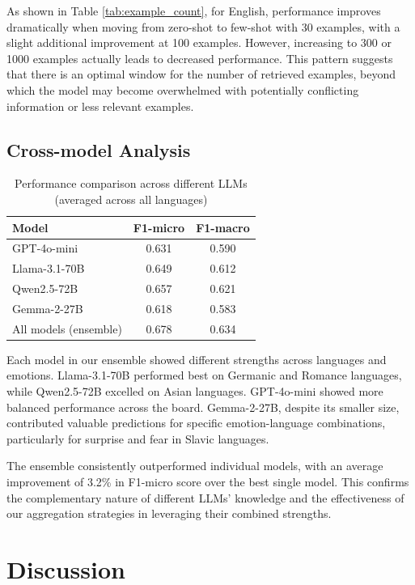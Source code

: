\documentclass[a4paper,12pt]{extarticle}
\begin{document}
As shown in Table \ref{tab:example_count}, for English, performance improves dramatically when moving from zero-shot to few-shot with 30 examples, with a slight additional improvement at 100 examples. However, increasing to 300 or 1000 examples actually leads to decreased performance. This pattern suggests that there is an optimal window for the number of retrieved examples, beyond which the model may become overwhelmed with potentially conflicting information or less relevant examples.

\subsection{Cross-model Analysis}

\begin{table}[h]
\centering
\begin{tabular}{lcc}
\toprule
\textbf{Model} & \textbf{F1-micro} & \textbf{F1-macro} \\
\midrule
GPT-4o-mini & 0.631 & 0.590 \\
Llama-3.1-70B & 0.649 & 0.612 \\
Qwen2.5-72B & 0.657 & 0.621 \\
Gemma-2-27B & 0.618 & 0.583 \\
All models (ensemble) & 0.678 & 0.634 \\
\bottomrule
\end{tabular}
\caption{Performance comparison across different LLMs (averaged across all languages)}
\label{tab:cross_model}
\end{table}

Each model in our ensemble showed different strengths across languages and emotions. Llama-3.1-70B performed best on Germanic and Romance languages, while Qwen2.5-72B excelled on Asian languages. GPT-4o-mini showed more balanced performance across the board. Gemma-2-27B, despite its smaller size, contributed valuable predictions for specific emotion-language combinations, particularly for surprise and fear in Slavic languages.

The ensemble consistently outperformed individual models, with an average improvement of 3.2\% in F1-micro score over the best single model. This confirms the complementary nature of different LLMs' knowledge and the effectiveness of our aggregation strategies in leveraging their combined strengths.

\section{Discussion}
\end{document}
